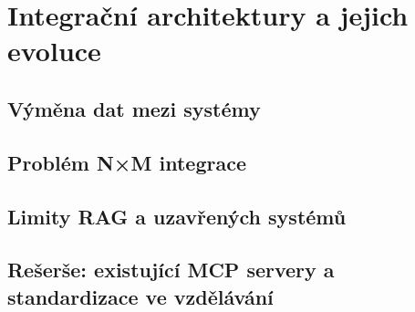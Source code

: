 \chapter{Integrační architektury a jejich evoluce}
\label{ch:integracni-architektury}

\section{Výměna dat mezi systémy}

\section{Problém N×M integrace}

\section{Limity RAG a uzavřených systémů}

\section{Rešerše: existující MCP servery a standardizace ve vzdělávání}
